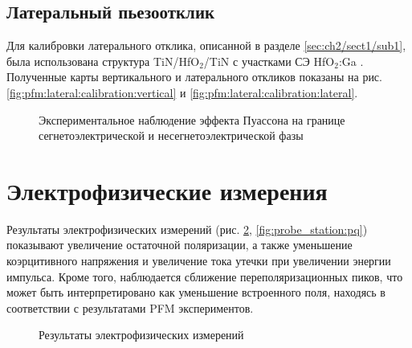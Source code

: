\subsection{Латеральный пьезоотклик}

Для калибровки латерального отклика, описанной в разделе \cref{sec:ch2/sect1/sub1}, была использована структура TiN/HfO\(_2\)/TiN с участками СЭ HfO\(_2\):Ga \cite{chouprikNanoscaleTailoringFerroelectricity2020}. Полученные карты вертикального и латерального откликов показаны на рис. \cref{fig:pfm:lateral:calibration:vertical} и \cref{fig:pfm:lateral:calibration:lateral}.

\begin{figure}[ht]
    \caption[Этот текст попадает в названия рисунков в списке рисунков]{Экспериментальное наблюдение эффекта Пуассона на границе сегнетоэлектрической и несегнетоэлектрической фазы}\label{fig:pfm:lateral:calibration}
\end{figure}

\section{Электрофизические измерения}

Результаты электрофизических измерений (рис. \cref{fig:probe_station}, \cref{fig:probe_station:pq}) показывают увеличение остаточной поляризации, а также уменьшение коэрцитивного напряжения и увеличение тока утечки при увеличении энергии импульса. Кроме того, наблюдается сближение переполяризационных пиков, что может быть интерпретировано как уменьшение встроенного поля, находясь в соответствии с результатами PFM экспериментов.

\begin{figure}[ht]
    \caption[Этот текст попадает в названия рисунков в списке рисунков]{Результаты электрофизических измерений}\label{fig:probe_station}
\end{figure}

